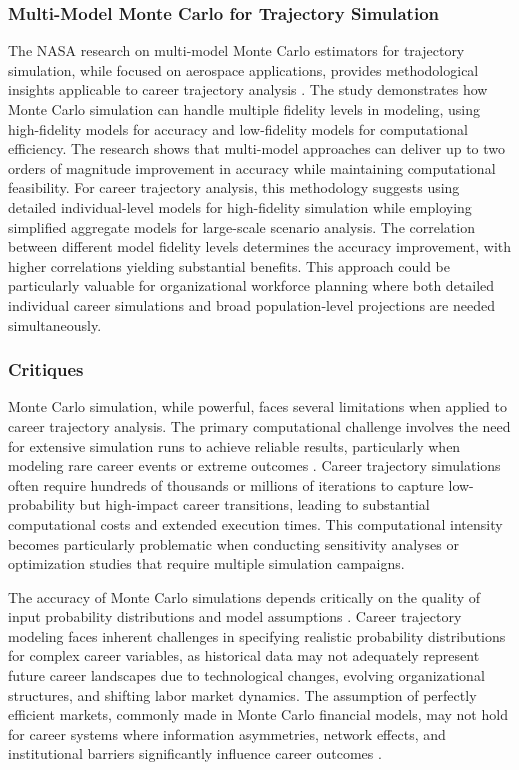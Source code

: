 \documentclass[main.tex]{subfiles}
\begin{document}
\subsubsection{Multi-Model Monte Carlo for Trajectory Simulation}

The NASA research on multi-model Monte Carlo estimators for trajectory simulation, while focused on aerospace applications, provides methodological insights applicable to career trajectory analysis \parencite{nasa2020}. The study demonstrates how Monte Carlo simulation can handle multiple fidelity levels in modeling, using high-fidelity models for accuracy and low-fidelity models for computational efficiency. The research shows that multi-model approaches can deliver up to two orders of magnitude improvement in accuracy while maintaining computational feasibility. For career trajectory analysis, this methodology suggests using detailed individual-level models for high-fidelity simulation while employing simplified aggregate models for large-scale scenario analysis. The correlation between different model fidelity levels determines the accuracy improvement, with higher correlations yielding substantial benefits. This approach could be particularly valuable for organizational workforce planning where both detailed individual career simulations and broad population-level projections are needed simultaneously.

\subsubsection{Critiques}

Monte Carlo simulation, while powerful, faces several limitations when applied to career trajectory analysis. The primary computational challenge involves the need for extensive simulation runs to achieve reliable results, particularly when modeling rare career events or extreme outcomes \parencite{investopedia2024,fishman2006}. Career trajectory simulations often require hundreds of thousands or millions of iterations to capture low-probability but high-impact career transitions, leading to substantial computational costs and extended execution times. This computational intensity becomes particularly problematic when conducting sensitivity analyses or optimization studies that require multiple simulation campaigns.

The accuracy of Monte Carlo simulations depends critically on the quality of input probability distributions and model assumptions \parencite{usp2024,sciencedirect2024}. Career trajectory modeling faces inherent challenges in specifying realistic probability distributions for complex career variables, as historical data may not adequately represent future career landscapes due to technological changes, evolving organizational structures, and shifting labor market dynamics. The assumption of perfectly efficient markets, commonly made in Monte Carlo financial models, may not hold for career systems where information asymmetries, network effects, and institutional barriers significantly influence career outcomes \parencite{investopedia2024}.
\end{document}
